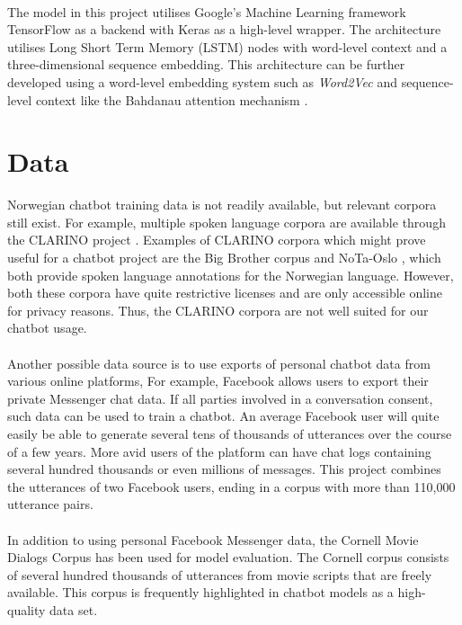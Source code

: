 \documentclass{article}
\begin{document}
\paragraph{}
The model in this project utilises Google's Machine Learning framework
TensorFlow as a backend with Keras as a high-level wrapper. The architecture
utilises Long Short Term Memory (LSTM) nodes with word-level context and a
three-dimensional sequence embedding. This architecture can be further
developed using a word-level embedding system such as \textit{Word2Vec}
\cite{word2vec} and sequence-level context like the Bahdanau attention
mechanism \cite{Bahdanau2015}.

\section*{Data}
Norwegian chatbot training data is not readily available, but relevant corpora
still exist.  For example, multiple spoken language corpora are available
through the CLARINO project \cite{clarino-about}. Examples of CLARINO
corpora which might prove useful for a chatbot project are the Big Brother
corpus \cite{clarino-bb} and NoTa-Oslo \cite{clarino-nota}, which both provide
spoken language annotations for the Norwegian language. However, both these
corpora have quite restrictive licenses and are only accessible online for
privacy reasons. Thus, the CLARINO corpora are not well suited for our chatbot
usage.

\paragraph{}
Another possible data source is to use exports of personal chatbot data from
various online platforms, For example, Facebook allows users to export their
private Messenger chat data. If all parties involved in a conversation consent,
such data can be used to train a chatbot. An average Facebook user will quite
easily be able to generate several tens of thousands of utterances over the
course of a few years. More avid users of the platform can have chat logs
containing several hundred thousands or even millions of messages. This project
combines the utterances of two Facebook users, ending in a corpus with more
than 110,000 utterance pairs.

\paragraph{}
In addition to using personal Facebook Messenger data, the Cornell Movie
Dialogs Corpus \cite{cornell-corpus} has been used for model evaluation. The
Cornell corpus consists of several hundred thousands of utterances from movie
scripts that are freely available. This corpus is frequently highlighted in
chatbot models as a high-quality data set.
\end{document}
